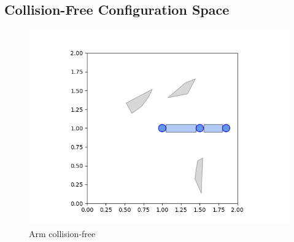 \documentclass{article}
\begin{document}
\subsection{Collision-Free Configuration Space}
\begin{figure}[htbp]
  \centering
  \begin{minipage}{0.45\textwidth}
    \includegraphics[width=\linewidth]{part4_arm_free.png}
    \caption{Arm collision-free}
  \end{minipage}\hfill
\end{figure}
\end{document}

